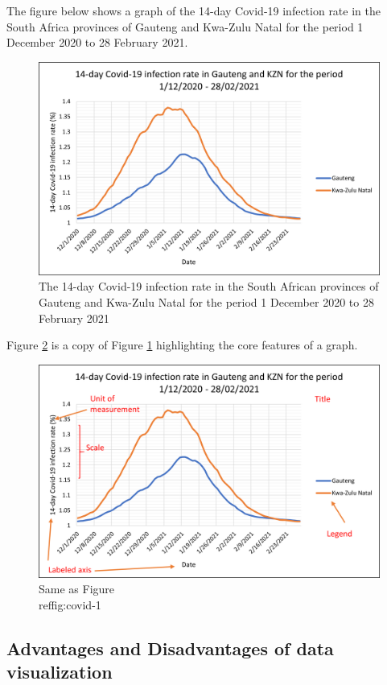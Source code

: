 \documentclass[
]{book}
\begin{document}
The figure below shows a graph of the 14-day Covid-19 infection rate in the South Africa provinces of Gauteng and Kwa-Zulu Natal for the period 1 December 2020 to 28 February 2021.

\begin{figure}

{\centering \includegraphics[width=0.7\linewidth]{Figures-Chapter1/Covid-1} 

}

\caption{The 14-day Covid-19 infection rate in the South African provinces of Gauteng and Kwa-Zulu Natal for the period 1 December 2020 to 28 February 2021}\label{fig:covid-1}
\end{figure}

Figure \ref{fig:covid-2} is a copy of Figure \ref{fig:covid-1} highlighting the core features of a graph.

\begin{figure}

{\centering \includegraphics[width=0.7\linewidth]{Figures-Chapter1/Covid-2} 

}

\caption{Same as Figure \\ref{fig:covid-1}}\label{fig:covid-2}
\end{figure}

\subsection{Advantages and Disadvantages of data visualization}\label{advantages-and-disadvantages-of-data-visualization}
\end{document}
